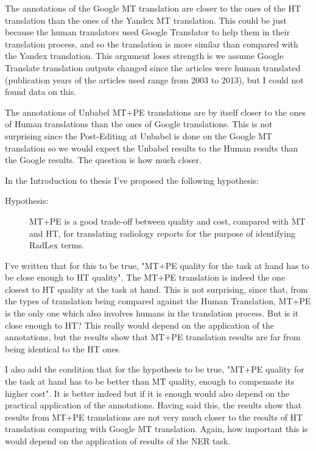 The annotations of the Google MT translation are closer to the ones of the HT translation than the ones of the Yandex MT translation. This could be just because the human translators used Google Translator to help them in their translation process, and so the translation is more similar than compared with the Yandex translation. This argument loses strength is we assume Google Translate translation outputs changed since the articles were human translated (publication years of the articles used range from 2003 to 2013), but I could not found data on this. 

The annotations of Unbabel MT+PE translations are by itself closer to the ones of Human translations than the ones of Google translations. This is not surprising since the Post-Editing at Unbabel is done on the Google MT translation so we would expect the Unbabel results to the Human results than the Google results. The question is how much closer. 

In the Introduction to thesis I've proposed the following hypothesis:

\begin{description}
	\item[Hypothesis:] MT+PE is a good trade-off between quality and cost, compared with MT and HT, for translating radiology reports for the purpose of identifying RadLex terms. 
\end{description}


I've written that for this to be true, "MT+PE quality for the task at hand has to be close enough to HT quality". The MT+PE translation is indeed the one closest to HT quality at the task at hand. This is not surprising, since that, from the types of translation being compared against the Human Translation, MT+PE is the only one which also involves humans in the translation process. But is it close enough to HT? This really would depend on the application of the annotations, but the results show that MT+PE translation results are far from being identical to the HT ones.  

I also add the condition that for the hypothesis to be true, "MT+PE quality for the task at hand has to be better than MT quality, enough to compensate its higher cost". It is better indeed but if it is enough would also depend on the practical application of the annotations. Having said this, the results show that results from MT+PE translations are not very much closer to the results of HT translation comparing with Google MT translation. Again, how important this is would depend on the application of results of the NER task. 

